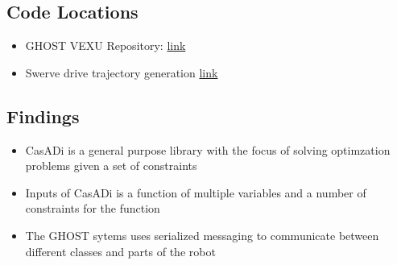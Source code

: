 \subsection*{Code Locations}
\begin{itemize}
    \item GHOST VEXU Repository: \href{https://github.com/VEXU-GHOST/VEXU_GHOST}{link}
    \item Swerve drive trajectory generation \href{https://github.com/VEXU-GHOST/VEXU_GHOST/blob/develop/11_Robots/ghost_swerve_mpc_planner/src/casadi_swerve_model_generation.cpp}{link}
\end{itemize}

\subsection*{Findings}
\begin{itemize}
    \item CasADi is a general purpose library with the focus of solving optimzation problems given a set of constraints
    \item Inputs of CasADi is a function of multiple variables and a number of constraints for the function
    \item The GHOST sytems uses serialized messaging to communicate between different classes and parts of the robot
\end{itemize}

